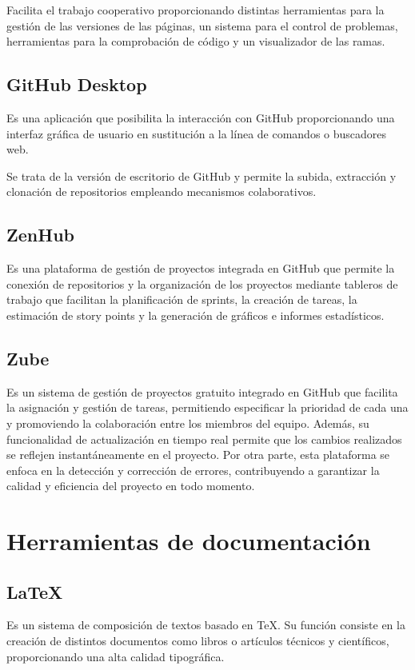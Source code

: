 \cite{GitHub2_bib} Facilita el trabajo cooperativo proporcionando distintas herramientas para la gestión de las versiones de las páginas, un sistema para el control de problemas, herramientas para la comprobación de código y un visualizador de las ramas.

\subsection{GitHub Desktop}
\cite{GitHubDesktop_bib} Es una aplicación que posibilita la interacción con GitHub proporcionando una interfaz gráfica de usuario en sustitución a la línea de comandos o buscadores web.

Se trata de la versión de escritorio de GitHub y permite la subida, extracción y clonación de repositorios empleando mecanismos colaborativos.

\subsection{ZenHub}
\cite{ZenHub_bib} Es una plataforma de gestión de proyectos integrada en GitHub que permite la conexión de repositorios y la organización de los proyectos mediante tableros de trabajo que facilitan la planificación de sprints, la creación de tareas, la estimación de story points y la generación de gráficos e informes estadísticos.

\subsection{Zube}
\cite{Zube_bib} Es un sistema de gestión de proyectos gratuito integrado en GitHub que facilita la asignación y gestión de tareas, permitiendo especificar la prioridad de cada una y promoviendo la colaboración entre los miembros del equipo. Además, su funcionalidad de actualización en tiempo real permite que los cambios realizados se reflejen instantáneamente en el proyecto. Por otra parte, esta plataforma se enfoca en la detección y corrección de errores, contribuyendo a garantizar la calidad y eficiencia del proyecto en todo momento.

\section{Herramientas de documentación}
\subsection{LaTeX}
\cite{LaTeX_bib} Es un sistema de composición de textos basado en TeX. Su función consiste en la creación
de distintos documentos como libros o artículos técnicos y científicos, proporcionando una alta calidad tipográfica. 

